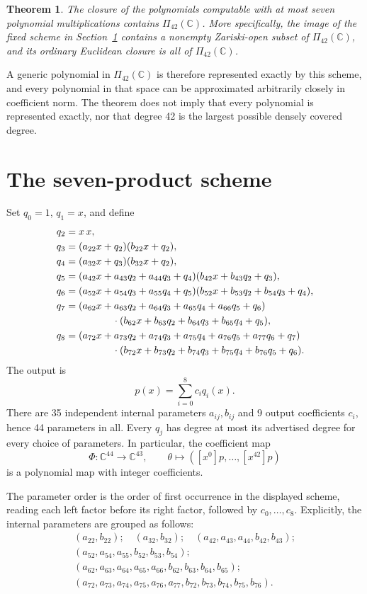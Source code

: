 \documentclass[11pt]{article}
\newtheorem{theorem}{Theorem}
\newcommand{\C}{\mathbb C}
\begin{document}
\begin{theorem}\label{thm:coverage}
The closure of the polynomials computable with at most seven polynomial multiplications contains $\Pi_{42}(\C)$. More specifically, the image of the fixed scheme in Section~\ref{sec:scheme} contains a nonempty Zariski-open subset of $\Pi_{42}(\C)$, and its ordinary Euclidean closure is all of $\Pi_{42}(\C)$.
\end{theorem}

A generic polynomial in $\Pi_{42}(\C)$ is therefore represented exactly by this scheme, and every polynomial in that space can be approximated arbitrarily closely in coefficient norm. The theorem does not imply that every polynomial is represented exactly, nor that degree 42 is the largest possible densely covered degree.

\section{The seven-product scheme}\label{sec:scheme}
Set $q_0=1$, $q_1=x$, and define
\begin{align*}
q_2={}&x\,x,\\
q_3={}&(a_{22}x+q_2)(b_{22}x+q_2),\\
q_4={}&(a_{32}x+q_3)(b_{32}x+q_2),\\
q_5={}&(a_{42}x+a_{43}q_2+a_{44}q_3+q_4)
       (b_{42}x+b_{43}q_2+q_3),\\
q_6={}&(a_{52}x+a_{54}q_3+a_{55}q_4+q_5)
       (b_{52}x+b_{53}q_2+b_{54}q_3+q_4),\\
q_7={}&(a_{62}x+a_{63}q_2+a_{64}q_3+a_{65}q_4+a_{66}q_5+q_6)\\
&\hspace{12mm}\cdot(b_{62}x+b_{63}q_2+b_{64}q_3+b_{65}q_4+q_5),\\
q_8={}&(a_{72}x+a_{73}q_2+a_{74}q_3+a_{75}q_4+a_{76}q_5+a_{77}q_6+q_7)\\
&\hspace{12mm}\cdot(b_{72}x+b_{73}q_2+b_{74}q_3+b_{75}q_4+b_{76}q_5+q_6).
\end{align*}
The output is
\[
p(x)=\sum_{i=0}^8 c_iq_i(x).
\]
There are 35 independent internal parameters $a_{ij},b_{ij}$ and 9 output coefficients $c_i$, hence 44 parameters in all. Every $q_j$ has degree at most its advertised degree for every choice of parameters. In particular, the coefficient map
\[
\Phi:\C^{44}\longrightarrow\C^{43},\qquad
\theta\longmapsto ([x^0]p,\ldots,[x^{42}]p)
\]
is a polynomial map with integer coefficients.

The parameter order is the order of first occurrence in the displayed scheme, reading each left factor before its right factor, followed by $c_0,\ldots,c_8$. Explicitly, the internal parameters are grouped as follows:
\[
\begin{gathered}
(a_{22},b_{22});\quad(a_{32},b_{32});\quad
(a_{42},a_{43},a_{44},b_{42},b_{43});\\
(a_{52},a_{54},a_{55},b_{52},b_{53},b_{54});\\
(a_{62},a_{63},a_{64},a_{65},a_{66},b_{62},b_{63},b_{64},b_{65});\\
(a_{72},a_{73},a_{74},a_{75},a_{76},a_{77},b_{72},b_{73},b_{74},b_{75},b_{76}).
\end{gathered}
\]
\end{document}
